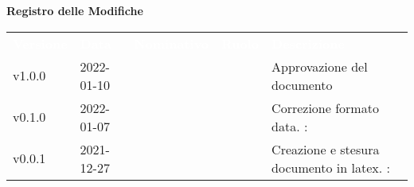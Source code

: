 

{\LARGE{\textbf{Registro delle Modifiche}}} \\
\begin{table}[!htbp]
\renewcommand{\arraystretch}{1.5}
\begin{tabular}{ m{}<{\centering}  m{}<{\centering}  m{}<{\centering}  m{}<{\centering}  m{}<{\centering} }
	\rowcolor{darkblue}
	\textcolor{white}{\textbf{Versione}} &\textcolor{white}{\textbf{Data}}& \textcolor{white}{\textbf{Nominativo}} & \textcolor{white}{\textbf{Ruolo}}&\textcolor{white}{\textbf{Descrizione}}\\ 

	v1.0.0 & 2022-01-10 & \GC & \RE & Approvazione del documento \\

	\rowcolor{gray!25}v0.1.0& 2022-01-07& \PV & \AN & Correzione formato data. \VE: \textit{\FP{}}\\

	v0.0.1& 2021-12-27& \PV &\AN & Creazione e stesura documento in latex. \VE: \textit{\FP{}}\\

\end{tabular}
\end{table}

\pagebreak